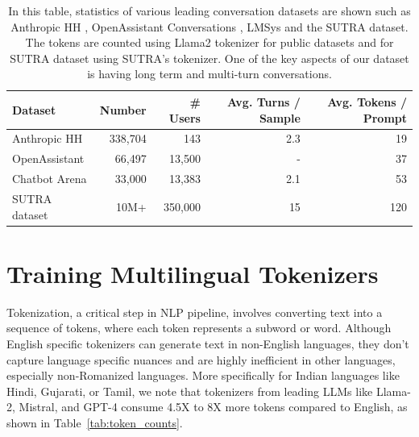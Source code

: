 \documentclass{article}
\begin{document}
\begin{table}[tb]
\setlength{\abovecaptionskip}{10pt} %
\setlength{\belowcaptionskip}{5pt} %
\centering
  \begin{tabular}{lrrrr}
  \toprule
  \textbf{Dataset}          & \textbf{Number} & \textbf{\# Users} & \textbf{Avg. Turns / Sample} & \textbf{Avg. Tokens / Prompt} \\ \midrule
  Anthropic HH              & 338,704         & 143               & 2.3                         & 19                            \\
  OpenAssistant             & 66,497          & 13,500            & -                           & 37                            \\
  Chatbot Arena             & 33,000          & 13,383            & 2.1                         & 53                            \\
  SUTRA dataset             & 10M+            & 350,000           & 15                          & 120                           \\
  \bottomrule
  \end{tabular}


\caption{In this table, statistics of various leading conversation datasets are shown such as Anthropic HH \citep{bai2022training}, OpenAssistant Conversations \citep{kopf2023openassistant}, LMSys \citep{chiang2024chatbot} and the SUTRA dataset. The tokens are counted using Llama2 tokenizer \citep{touvron2023llama2} for public datasets and for SUTRA dataset using SUTRA's tokenizer. One of the key aspects of our dataset is having long term and multi-turn conversations.}

\label{table:datasets_summary}
\end{table}


\section{Training Multilingual Tokenizers}
Tokenization, a critical step in NLP pipeline, involves converting text into a sequence of tokens, where each token represents a subword or word. Although English specific tokenizers can generate text in non-English languages, they don't capture language specific nuances and are highly inefficient in other languages, especially non-Romanized languages. More specifically for Indian languages like Hindi, Gujarati, or Tamil, we note that tokenizers from leading LLMs like Llama-2, Mistral, and GPT-4 consume 4.5X to 8X more tokens compared to English, as shown in Table~\ref{tab:token_counts}.
\end{document}
